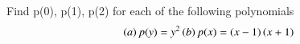 Find p(0), p(1), p(2) for each of the following polynomials
\begin{align}
\left(a\right) p(y) = y^{2}
\left(b\right) p(x) = \left(x-1\right)\left(x+1\right)
\end{align}
